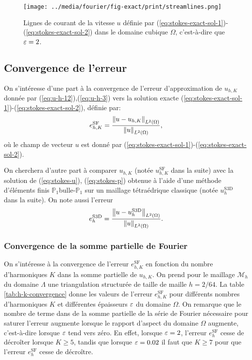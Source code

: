 \begin{figure}[t]
  \begin{center}
    \texttt{[image: ../media/fourier/fig-exact/print/streamlines.png]}
    \caption{Lignes de courant de la vitesse $u$ définie par
      (\ref{eq:stokes-exact-sol-1})-(\ref{eq:stokes-exact-sol-2}) dans
      le domaine cubique $\Omega$, c'est-à-dire que $\varepsilon = 2$.}
    \label{fig:stokes-exact-sol-streamlines}
  \end{center}
\end{figure}


\subsection{Convergence de l'erreur}
On s'intéresse d'une part à la convergence de l'erreur d'approximation
de $u_{h,K}$ donnée par (\ref{eq:u-h-12}),(\ref{eq:u-h-3}) vers la
solution exacte
(\ref{eq:stokes-exact-sol-1})-(\ref{eq:stokes-exact-sol-2}), définie
par:
\begin{equation}
  e_{h,K}^{\mathrm{SF}} =
  \frac{\left\lVert u - u_{h,K} \right\rVert_{L^2(\Omega)}}{\left\lVert u \right\rVert_{L^2(\Omega)}},
\end{equation}
où le champ de vecteur $u$ est donné par
(\ref{eq:stokes-exact-sol-1})-(\ref{eq:stokes-exact-sol-2}).

On cherchera d'autre part à comparer $u_{h,K}$ (notée
$u_{h,K}^{\mathrm{SF}}$ dans la suite) avec la solution de
(\ref{eq:stokes-u}), (\ref{eq:stokes-p}) obtenue à l'aide d'une
méthode d'éléments finis $\mathbb P_1$bulle-$\mathbb P_1$ sur un
maillage tétraédrique classique (notée
$u_h^\mathrm{S3D}$ dans la suite). On note aussi l'erreur
\begin{equation}
  e_h^{\mathrm{S3D}} = \frac{\left\lVert u - u_h^{\mathrm{S3D}} \right\rVert_{L^2(\Omega)}}{\left\lVert u \right\rVert_{L^2(\Omega)}}.
\end{equation}

\renewcommand{\floatpagefraction}{.9}%
\renewcommand{\topfraction}{.9}
\setcounter{topnumber}{3}
\setcounter{totalnumber}{4}

\subsubsection{Convergence de la somme partielle de Fourier}
On s'intéresse à la convergence de l'erreur $e_{h,K}^\mathrm{SF}$ en
fonction du nombre d'harmoniques $K$ dans la somme partielle de
$u_{h,K}$. On prend pour le maillage $\mathcal M_h$ du domaine $\Lambda$
une triangulation structurée de taille de maille $h = 2/64$. La
table \ref{tab:h-k-convergence} donne les valeurs de l'erreur
$e_{h,K}^\mathrm{SF}$ pour différents nombres d'harmoniques $K$ et
différentes épaisseurs $\varepsilon$ du domaine $\Omega$. On remarque
que le nombre de terme dans de la somme partielle de la série de
Fourier nécessaire pour saturer l'erreur augmente lorsque le rapport
d'aspect du domaine $\Omega$ augmente, c'est-à-dire lorsque
$\varepsilon$ tend vers zéro. En effet, lorsque $\varepsilon = 2$,
l'erreur $e_h^\mathrm{SF}$ cesse de décroîter lorsque $K \geq 5$,
tandis que lorsque $\varepsilon = 0.02$ il faut que $K \geq 7$ pour que
l'erreur $e_h^\mathrm{SF}$ cesse de décroître.

